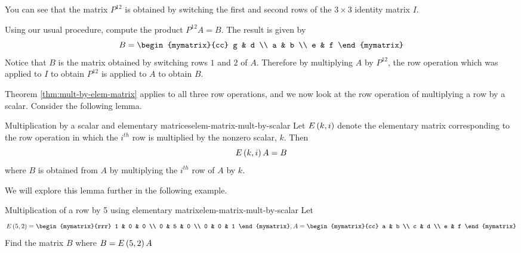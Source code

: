 \begin{solution}
You can see that the matrix $P^{12}$ is obtained by switching the first and second rows of the $3 \times 3$ identity matrix $I$.

Using our usual procedure, compute the product $P^{12}A = B$. The result is given by
\begin{equation*}
B =\begin{mymatrix}{cc}
g & d \\
a & b \\
e & f
\end{mymatrix}
\end{equation*}
Notice that $B$ is the matrix obtained by switching rows $1$ and $2$ of $A$. Therefore by  multiplying 
$A$ by $P^{12}$, the row operation which was applied to $I$ to obtain $P^{12}$ is applied to $A$ to obtain $B$. 
\end{solution}

Theorem \ref{thm:mult-by-elem-matrix} applies to all three row operations, and we now 
look at the row operation of multiplying a row by a scalar.  Consider the following lemma.

\begin{lemma}{Multiplication by a scalar and elementary matrices}{elem-matrix-mult-by-scalar}
Let $E\left(k,i\right) $ denote the elementary matrix
corresponding to the row operation in which the $i^{th}$ row is multiplied
by the nonzero scalar, $k.$  Then
\begin{equation*}
E\left(k,i\right) A=B
\end{equation*}
where $B$ is obtained from $A$ by multiplying the $i^{th}$ row of $A$ by $k$.
\end{lemma}

We will explore this lemma further in the following example.

\begin{example}{Multiplication of a row by 5 using elementary matrix}{elem-matrix-mult-by-scalar}
Let
\begin{equation*}
E \tup{5, 2} = \begin{mymatrix}{rrr}
1 & 0 & 0 \\
0 & 5 & 0 \\
0 & 0 & 1
\end{mymatrix}, A =  \begin{mymatrix}{cc}
a & b \\
c & d \\
e & f
\end{mymatrix}
\end{equation*}
Find the matrix $B$ where $B = E \left(5, 2\right)A$
\end{example}

